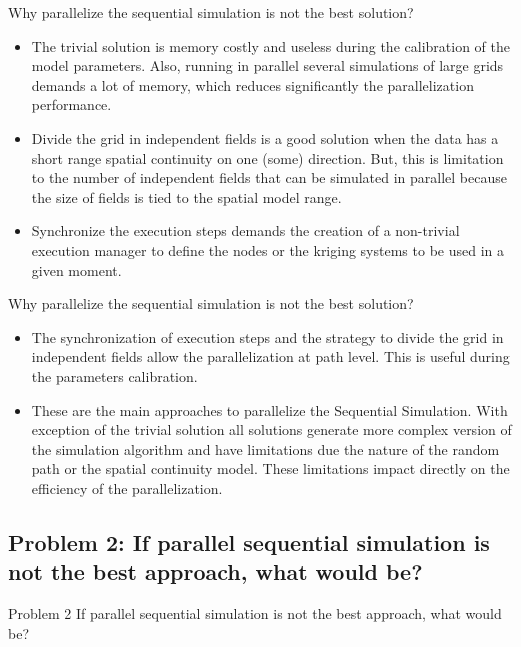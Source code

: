 \begin{frame}{Why parallelize the sequential simulation is not the best solution?}
	\begin{itemize}
    	\item The trivial solution is memory costly and useless during the calibration of the model parameters. Also, running in parallel several simulations of large grids demands a lot of memory, which reduces significantly the parallelization performance.
        \item Divide the grid in independent fields is a good solution when the data has a short range spatial continuity on one (some) direction. But, this is  limitation to the number of independent fields that can be simulated in parallel because the size of fields is tied to the spatial model range.
        \item Synchronize the execution steps demands the creation of a non-trivial execution manager to define the nodes or the kriging systems to be used in a given moment.
    \end{itemize}
\end{frame}


\begin{frame}{Why parallelize the sequential simulation is not the best solution?}
	\begin{itemize}
    	\item The synchronization of execution steps and the strategy to divide the grid in independent fields allow the parallelization at path level. This is useful during the parameters calibration.
        \item These are the main approaches to parallelize the Sequential Simulation. With exception of the trivial solution all solutions generate more complex version of the simulation algorithm and have limitations due the nature of the random path or the spatial continuity model. These limitations impact directly on the efficiency of the parallelization.
    \end{itemize}
\end{frame}

\subsection{Problem 2: If parallel sequential simulation is not the best approach, what would be?}
\begin{frame}{Problem 2}	
If parallel sequential simulation is not the best approach, what would be?
\end{frame}


